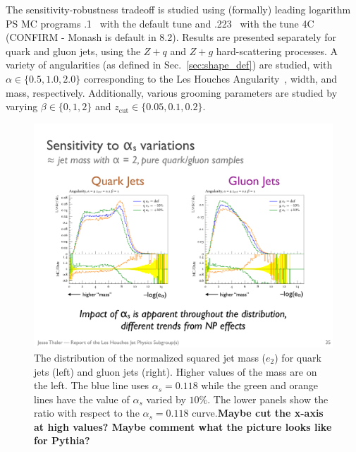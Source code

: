 The sensitivity-robustness tradeoff is studied using (formally) leading logarithm PS MC programs \herwig.1~\cite{Bellm:2015jjp,Reichelt:2017hts} with the default tune and \pythia.223~\cite{Sjostrand:2006za,Sjostrand:2014zea} with the tune 4C (CONFIRM - Monash is default in 8.2).  Results are presented separately for quark and gluon jets, using the $Z+q$ and $Z+g$ hard-scattering processes.  A variety of angularities (as defined in Sec.~\ref{sec:shape_def}) are studied, with $\alpha\in\{0.5,1.0, 2.0\}$ corresponding to the Les Houches Angularity~\cite{Gras:2017jty}, width, and mass, respectively.  Additionally, various grooming parameters are studied by varying $\beta\in\{0,1,2\}$ and $z_\text{cut}\in \{0.05,0.1,0.2\}$.  

\begin{figure}[h!]
\begin{center}
\includegraphics[width = 0.99\columnwidth]{figures/sensitivity.pdf}
\end{center}
\caption{The distribution of the normalized squared jet mass ($e_2$)
  for quark jets (left) and gluon jets (right).  Higher values of the
  mass are on the left.  The blue line uses $\alpha_s=0.118$ while the
  green and orange lines have the value of $\alpha_s$ varied by
  $10\%$.  The lower panels show the ratio with respect to the
  $\alpha_s=0.118$ curve.\textbf{Maybe cut the x-axis at high values?
      Maybe comment what
    the picture looks like for Pythia?}}
\label{fig:sensitivity}
\end{figure}

